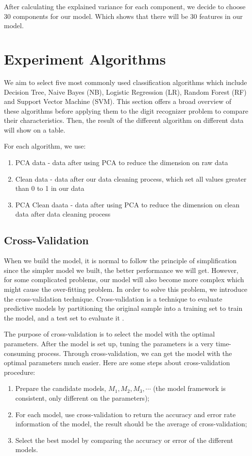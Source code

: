 \documentclass[sigconf]{acmart}
\begin{document}
After calculating the explained variance for each component, we decide to choose 30 components for our model. Which shows that there will be 30 features in our model.

\section{Experiment Algorithms}

We aim to select five most commonly used classification algorithms which include Decision Tree, Naive Bayes (NB), Logistic Regression (LR), Random Forest (RF) and Support Vector Machine (SVM). This section offers a broad overview of these algorithms before applying them to the digit recognizer problem to compare their characteristics. Then, the result of the different algorithm on different data will show on a table.

For each algorithm, we use:
\begin{enumerate}
    \item PCA data - data after using PCA to reduce the dimension on raw data
    \item Clean data - data after our data cleaning process, which set all values greater than 0 to 1 in our data
    \item PCA Clean daata - data after using PCA to reduce the dimension on clean data after data cleaning process
\end{enumerate}

\subsection{Cross-Validation}

When we build the model, it is normal to follow the principle of simplification since the simpler model we built, the better performance we will get. However, for some complicated problems, our model will also become more complex which might cause the over-fitting problem. In order to solve this problem, we introduce the cross-validation technique. Cross-validation is a technique to evaluate predictive models by partitioning the original sample into a training set to train the model, and a test set to evaluate it \cite{10f.cv}.

The purpose of cross-validation is to select the model with the optimal parameters. After the model is set up, tuning the parameters is a very time-consuming process. Through cross-validation, we can get the model with the optimal parameters much easier. Here are some steps about cross-validation procedure:
\begin{enumerate}
    \item Prepare the candidate models, $M_1,M_2,M_3,\cdots$ (the model framework is consistent, only different on the parameters);
    \item For each model, use cross-validation to return the accuracy and error rate information of the model, the result should be the average of cross-validation;
    \item Select the best model by comparing the accuracy or error of the different models.
\end{enumerate}
\end{document}
